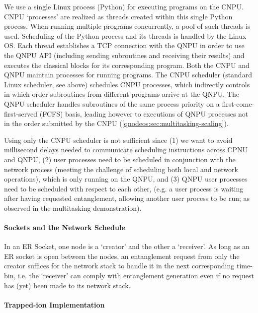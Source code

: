 We use a single Linux process (Python) for executing programs on the CNPU. CNPU `processes' are realized as threads created within this single Python process. When running multiple programs concurrently, a pool of such threads is used. Scheduling of the Python process and its threads is handled by the Linux OS. Each thread establishes a TCP connection with the QNPU in order to use the QNPU API (including sending subroutines and receiving their results) and executes the classical blocks for its corresponding program. 
Both the CNPU and QNPU maintain processes for running programs. The CNPU scheduler (standard Linux scheduler, see above) schedules CNPU processes, which indirectly controls in which order subroutines from different programs arrive at the QNPU. The QNPU scheduler handles subroutines of the same process priority on a first-come-first-served (FCFS) basis, leading however to executions of QNPU processes not in the order submitted by the CNPU (\cref{qnodeos:sec:multitasking-scaling}).

Using only the CNPU scheduler is not sufficient since (1) we want to avoid millisecond delays needed to communicate scheduling instructions across CPNU and QNPU, (2) user processes need to be scheduled in conjunction with the network process (meeting the challenge of scheduling both local and network operations), which is only running on the QNPU, and (3) QNPU user processes need to be scheduled with respect to each other, (e.g. a user process is waiting after having requested entanglement, allowing another user process to be run; as observed in the multitasking demonstration). 

\paragraph{Sockets and the Network Schedule}
In an ER Socket, one node is a `creator' and the other a `receiver'. As long as an ER socket is open between the nodes, an entanglement request from only the creator suffices for the network stack to handle it in the next corresponding time-bin, i.e. the `receiver' can comply with entanglement generation even if no request has (yet) been made to its network stack.

\paragraph{Trapped-ion Implementation}

